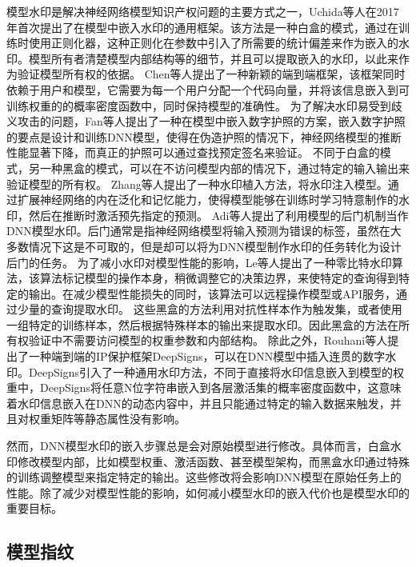 模型水印\cite{GYKJ202207020}是解决神经网络模型知识产权问题的主要方式之一，Uchida等人\cite{uchida2017embedding}在2017年首次提出了在模型中嵌入水印的通用框架。该方法是一种白盒的模式，通过在训练时使用正则化器，这种正则化在参数中引入了所需要的统计偏差来作为嵌入的水印。模型所有者清楚模型内部结构等的细节，并且可以提取嵌入的水印，以此来作为验证模型所有权的依据\cite{zhang2021deep}。
Chen等人\cite{chen2018deepmarks}提出了一种新颖的端到端框架，该框架同时依赖于用户和模型，它需要为每一个用户分配一个代码向量，并将该信息嵌入到可训练权重的的概率密度函数中，同时保持模型的准确性。
为了解决水印易受到歧义攻击的问题，Fan等人\cite{fan2019rethinking}提出了一种在模型中嵌入数字护照的方案，嵌入数字护照的要点是设计和训练DNN模型，使得在伪造护照的情况下，神经网络模型的推断性能显著下降，而真正的护照可以通过查找预定签名来验证。
不同于白盒的模式，另一种黑盒的模式，可以在不访问模型内部的情况下，通过特定的输入输出来验证模型的所有权。
Zhang等人\cite{zhang2018protecting}提出了一种水印植入方法，将水印注入模型。通过扩展神经网络的内在泛化和记忆能力，使得模型能够在训练时学习特意制作的水印，然后在推断时激活预先指定的预测。
Adi等人\cite{adi2018turning}提出了利用模型的后门机制当作DNN模型水印。后门通常是指神经网络模型将输入预测为错误的标签，虽然在大多数情况下这是不可取的，但是却可以将为DNN模型制作水印的任务转化为设计后门的任务。
为了减小水印对模型性能的影响，Le等人\cite{le2020adversarial}提出了一种零比特水印算法，该算法标记模型的操作本身，稍微调整它的决策边界，来使特定的查询得到特定的输出。在减少模型性能损失的同时，该算法可以远程操作模型或API服务，通过少量的查询提取水印。
这些黑盒的方法利用对抗性样本作为触发集，或者使用一组特定的训练样本，然后根据特殊样本的输出来提取水印。因此黑盒的方法在所有权验证中不需要访问模型的权重参数和内部结构。
除此之外，Rouhani等人\cite{rouhani2018deepsigns}提出了一种端到端的IP保护框架DeepSigns，可以在DNN模型中插入连贯的数字水印。DeepSigns引入了一种通用水印方法，不同于直接将水印信息嵌入到模型的权重中，DeepSigns将任意N位字符串嵌入到各层激活集的概率密度函数中，这意味着水印信息嵌入在DNN的动态内容中，并且只能通过特定的输入数据来触发，并且对权重矩阵等静态属性没有影响。

然而，DNN模型水印的嵌入步骤总是会对原始模型进行修改。具体而言，白盒水印修改模型内部，比如模型权重、激活函数、甚至模型架构，而黑盒水印通过特殊的训练调整模型来指定特定的输出。这些修改将会影响DNN模型在原始任务上的性能。除了减少对模型性能的影响，如何减小模型水印的嵌入代价也是模型水印的重要目标。

\subsection{模型指纹}

